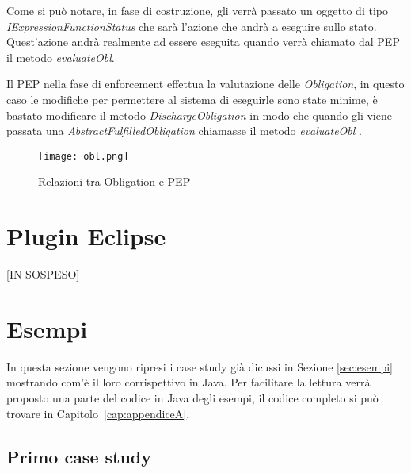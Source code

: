Come si può notare, in fase di costruzione, gli verrà passato un oggetto di tipo \textit{IExpressionFunctionStatus} che sarà l'azione che andrà a eseguire sullo stato. Quest'azione andrà realmente ad essere eseguita quando verrà chiamato dal \ac{PEP} il metodo \textit{evaluateObl}.\\ \par
Il \ac{PEP} nella fase di enforcement effettua la valutazione delle \textit{Obligation}, in questo caso le modifiche per permettere al sistema di eseguirle sono state minime, è bastato modificare il metodo \textit{DischargeObligation} in modo che quando gli viene passata una \textit{AbstractFulfilledObligation} chiamasse il metodo \textit{evaluateObl} .
\begin{sidewaysfigure}[H]
    \centering
	\texttt{[image: obl.png]}
    \caption{Relazioni tra Obligation e PEP}
    \label{fig:obl.png}
\end{sidewaysfigure}




\section{Plugin Eclipse}
\label{sec:plugin_eclipse}


[IN SOSPESO]


\section{Esempi}
\label{sec:implementazione_esempi}

In questa sezione vengono ripresi i case study già dicussi in Sezione \ref{sec:esempi} mostrando com'è il loro corrispettivo in Java. 
Per facilitare la lettura verrà proposto una parte del codice in Java degli esempi, il codice completo si può trovare in Capitolo~\ref{cap:appendiceA}.


\subsection{Primo case study}
\label{sub:primo_std_java}


